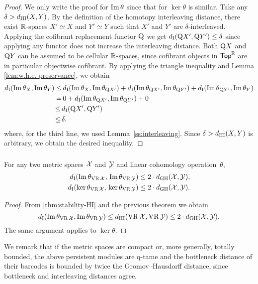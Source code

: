 \begin{proof}
	We only write the proof for $\operatorname{Im}\theta$ since that for $\ker\theta$ is similar.
	Take any $\delta > d_{\mathrm{HI}}(X,Y)$.
	By the definition of the homotopy interleaving distance, there exist $\mathbb{R}$-spaces $X' \simeq X$ and $Y' \simeq Y$ such that $X'$ and $Y'$ are $\delta$-interleaved.
	Applying the cofibrant replacement functor $\mathrm{Q}$ we get $d_{\mathrm{I}}(\mathrm{Q} X', \mathrm{Q} Y') \leq \delta$ since applying any functor does not increase the interleaving distance.
	Both $\mathrm{Q} X$ and $\mathrm{Q} Y$ can be assumed to be cellular $\mathbb{R}$-spaces, since cofibrant objects in $\mathsf{Top}^{\mathbb{R}}$ are in particular objectwise cofibrant.
	By applying the triangle inequality and Lemma \ref{lem:w.h.e. preservance}, we obtain
	\begin{align*}
		d_{\mathrm{I}}(\operatorname{Im}\theta_{X}, \operatorname{Im}\theta_{Y}) \leq& \,
		d_{\mathrm{I}}(\operatorname{Im}\theta_{X}, \operatorname{Im}\theta_{\mathrm{Q} X'}) + d_{\mathrm{I}}(\operatorname{Im}\theta_{\mathrm{Q} X'}, \operatorname{Im}\theta_{\mathrm{Q} Y'}) + d_{\mathrm{I}}(\operatorname{Im}\theta_{\mathrm{Q} Y'}, \operatorname{Im}\theta_{Y}) \\ =& \,
		0 + d_{\mathrm{I}}(\operatorname{Im}\theta_{\mathrm{Q} X'}, \operatorname{Im}\theta_{\mathrm{Q} Y'}) + 0 \\ \leq \,&
		d_{\mathrm{I}}(\mathrm{Q} X', \mathrm{Q} Y') \\ \leq \,&
		\delta.
	\end{align*}
	where, for the third line, we used Lemma~\ref{ss:interleaving}.
 	Since $\delta > d_{\mathrm{HI}}(X,Y)$ is arbitrary, we obtain the desired inequality.
\end{proof}

\subsubsection{}\label{cor:theta stability VR}

\corollary For any two metric spaces $\mathcal{X}$ and $\mathcal{Y}$ and linear cohomology operation~$\theta$,
\begin{align*}
	d_{\mathrm{I}}(\operatorname{Im}\theta_{\operatorname{VR}\mathcal{X}},\, \operatorname{Im}\theta_{\operatorname{VR}\mathcal{Y}}) \leq 2 \cdot d_{\mathrm{GH}}(\mathcal{X},\mathcal{Y}), \\
	d_{\mathrm{I}}(\ker\theta_{\operatorname{VR}\mathcal{X}},\, \ker\theta_{\operatorname{VR}\mathcal{Y}}) \leq 2 \cdot d_{\mathrm{GH}}(\mathcal{X},\mathcal{Y}).
\end{align*}

\begin{proof}
        From \cref{thm:stability-HI} and the previous theorem we obtain
        \[
        d_{\mathrm{I}}(\operatorname{Im}\theta_{\operatorname{VR}\mathcal{X}}, \operatorname{Im}\theta_{\operatorname{VR}\mathcal{Y}}) \leq
        d_{\mathrm{HI}}(\operatorname{VR}\mathcal{X}, \operatorname{VR}\mathcal{Y}) \leq 2 \cdot d_{\mathrm{GH}}(\mathcal{X},\mathcal{Y}).
        \]
        The same argument applies to $\ker\theta$.
\end{proof}

We remark that if the metric spaces are compact or, more generally, totally bounded, the above persistent modules are q-tame and the bottleneck distance of their barcodes is bounded by twice the Gromov--Hausdorff distance, since bottleneck and interleaving distances agree.